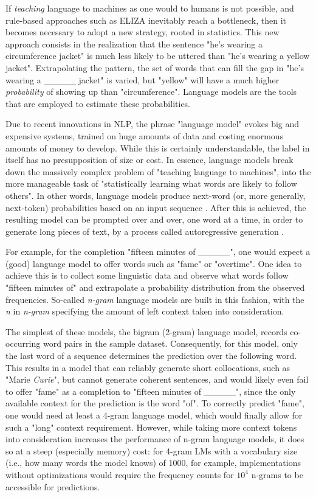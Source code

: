 If \emph{teaching} language to machines as one would to humans is not possible, and rule-based approaches such as ELIZA inevitably reach a bottleneck, then it becomes necessary to adopt a new strategy, rooted in statistics.
This new approach consists in the realization that the sentence "he's wearing a circumference jacket" is much less likely to be uttered than "he's wearing a yellow jacket".
Extrapolating the pattern, the set of words that can fill the gap in "he's wearing a \_\_\_\_\_ jacket" is varied, but "yellow" will have a much higher \emph{probability} of showing up than "circumference".
Language models are the tools that are employed to estimate these probabilities.

Due to recent innovations in NLP, the phrase "language model" evokes big and expensive systems, trained on huge amounts of data and costing enormous amounts of money to develop.
While this is certainly understandable, the label in itself has no presupposition of size or cost.
In essence, language models break down the massively complex problem of "teaching language to machines", into the more manageable task of "statistically learning what words are likely to follow others".
In other words, language models produce next-word (or, more generally, next-token) probabilities based on an input sequence \citep{citationneeded}.
After this is achieved, the resulting model can be prompted over and over, one word at a time, in order to generate long pieces of text, by a process called autoregressive generation \citep{citationneeded}.

For example, for the completion "fifteen minutes of \_\_\_\_\_", one would expect a (good) language model to offer words such as "fame" or "overtime".
One idea to achieve this is to collect some linguistic data and observe what words follow "fifteen minutes of" and extrapolate a probability distribution from the observed frequencies.
So-called \emph{n-gram} language models \citep{citationneeded} are built in this fashion, with the \emph{n} in \emph{n-gram} specifying the amount of left context taken into consideration.

The simplest of these models, the bigram (2-gram) language model, records co-occurring word pairs in the sample dataset.
Consequently, for this model, only the last word of a sequence determines the prediction over the following word.
This results in a model that can reliably generate short collocations, such as "Marie \emph{Curie}", but cannot generate coherent sentences, and would likely even fail to offer "fame" as a completion to "fifteen minutes of \_\_\_\_\_", since the only available context for the prediction is the word "of".
To correctly predict "fame", one would need at least a 4-gram language model, which would finally allow for such a "long" context requirement.
However, while taking more context tokens into consideration increases the performance of n-gram language models, it does so at a steep (especially memory) cost: for 4-gram LMs with a vocabulary size (i.e., how many words the model knows) of 1000, for example, implementations without optimizations would require the frequency counts for $10^{4}$ n-grams to be accessible for predictions.

